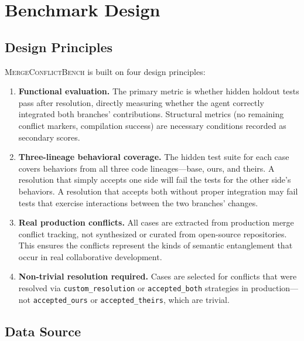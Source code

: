 \documentclass[11pt,letterpaper]{article}
\begin{document}
\section{Benchmark Design}
\label{sec:design}

\subsection{Design Principles}

\textsc{MergeConflictBench} is built on four design principles:

\begin{enumerate}[leftmargin=2em]
\item \textbf{Functional evaluation.} The primary metric is whether hidden holdout tests pass after resolution, directly measuring whether the agent correctly integrated both branches' contributions. Structural metrics (no remaining conflict markers, compilation success) are necessary conditions recorded as secondary scores.

\item \textbf{Three-lineage behavioral coverage.} The hidden test suite for each case covers behaviors from all three code lineages---base, ours, and theirs. A resolution that simply accepts one side will fail the tests for the other side's behaviors. A resolution that accepts both without proper integration may fail tests that exercise interactions between the two branches' changes.

\item \textbf{Real production conflicts.} All cases are extracted from production merge conflict tracking, not synthesized or curated from open-source repositories. This ensures the conflicts represent the kinds of semantic entanglement that occur in real collaborative development.

\item \textbf{Non-trivial resolution required.} Cases are selected for conflicts that were resolved via \texttt{custom\_resolution} or \texttt{accepted\_both} strategies in production---not \texttt{accepted\_ours} or \texttt{accepted\_theirs}, which are trivial.
\end{enumerate}

\subsection{Data Source}
\end{document}
